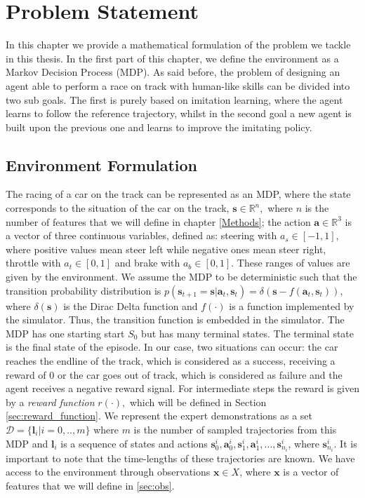 \chapter{Problem Statement}
\label{Problem_Statement}
\thispagestyle{empty}

In this chapter we provide a mathematical formulation of the problem we tackle in this thesis.
In the first part of this chapter, we define the environment as a Markov Decision Process (MDP).
As said before, the problem of designing an agent able to perform a race on track with human-like skills can be divided into two sub goals. The first is purely based on imitation learning, where the agent learns to follow the reference trajectory, whilst in the second goal a new agent is built upon the previous one and learns to improve the imitating policy.


\section{Environment Formulation}

The racing of a car on the track can be represented as an MDP, where the state corresponds to the situation of the car on the track, $\boldsymbol s \in \mathbb{R}^n,$ where $n$ is the number of features that we will define in chapter \ref{Methods}; the action $\boldsymbol a \in \mathbb{R}^3$ is a vector of three continuous variables, defined as: steering with $ a_s \in [-1,1] $, where positive values mean steer left while negative ones mean steer right, throttle with $ a_t \in [0,1] $ and brake with $ a_b \in [0,1] $. These ranges of values are given by the environment. We assume the MDP to be deterministic such that the transition probability distribution is  $p(\boldsymbol s_{t+1}=\boldsymbol s|\boldsymbol a_t, \boldsymbol s_t) = \delta(\boldsymbol s - f(\boldsymbol a_t,\boldsymbol s_t)),$ where $\delta(\boldsymbol s)$ is the Dirac Delta function and $f(\cdot)$ is a function implemented by the simulator. Thus, the transition function is embedded in the simulator.
The MDP has one starting start $S_0$ but has many terminal states. The terminal state is the final state of the episode. In our case, two situations can occur: the car reaches the endline of the track, which is considered as a success, receiving a reward of $0$ or the car goes out of track, which is considered as failure and the agent receives a negative reward signal. For intermediate steps the reward is given by a \textit{reward function} $r(\cdot),$ which will be defined in Section \ref{sec:reward_function}.
We represent the expert demonstrations as a set $\mathcal{D}=\{\boldsymbol l_i|i= 0,..,m\}$ where $m$ is the number of sampled trajectories from this MDP and $\boldsymbol l_i$ is a sequence of states and actions $\boldsymbol s_0^i,\boldsymbol a_0^i,\boldsymbol s_1^i,\boldsymbol a_1^i,...,\boldsymbol s^i_{n_i}$, where $\boldsymbol s^i_{n_i}$. It is important to note that the time-lengths of these trajectories are known.
We have access to the environment through observations $\boldsymbol x \in X$, where $\boldsymbol x$ is a vector of features that we will define in \ref{sec:obs}.

